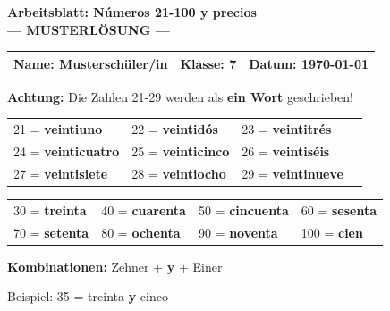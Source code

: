 \documentclass[11pt, a4paper]{article}
\newcommand{\fachfarbe}{spanisch}
\newcommand{\thema}{Números 21-100 y precios}
\newcommand{\klasse}{7}
\newcommand{\datum}{\today}
\newcommand{\loesung}[1]{\textcolor{loesung}{\textbf{#1}}}
\newcommand{\es}[1]{\textcolor{\fachfarbe}{\textbf{#1}}}
\begin{document}

\begin{center}
    {\Large\bfseries\textcolor{\fachfarbe}{Arbeitsblatt: \thema}}\\[0.3em]
    {\large\textcolor{loesung}{\textbf{--- MUSTERLÖSUNG ---}}}
\end{center}

\vspace{5pt}

\noindent
\begin{tabularx}{\textwidth}{|X|X|X|}
\hline
\textbf{Name:} \textcolor{loesung}{Musterschüler/in} &
\textbf{Klasse:} \klasse &
\textbf{Datum:} \datum \\
\hline
\end{tabularx}

\vspace{15pt}


\begin{merkkasten}
\textbf{Achtung:} Die Zahlen 21-29 werden als \textbf{ein Wort} geschrieben!

\vspace{0.5em}

\begin{tabular}{llll}
21 = \loesung{veintiuno} & 22 = \loesung{veintidós} & 23 = \loesung{veintitrés} \\[0.8em]
24 = \loesung{veinticuatro} & 25 = \loesung{veinticinco} & 26 = \loesung{veintiséis} \\[0.8em]
27 = \loesung{veintisiete} & 28 = \loesung{veintiocho} & 29 = \loesung{veintinueve} \\
\end{tabular}

\end{merkkasten}

\vspace{10pt}


\begin{merkkasten}
\begin{tabular}{llll}
30 = \loesung{treinta} & 40 = \loesung{cuarenta} & 50 = \loesung{cincuenta} & 60 = \loesung{sesenta} \\[0.8em]
70 = \loesung{setenta} & 80 = \loesung{ochenta} & 90 = \loesung{noventa} & 100 = \loesung{cien} \\
\end{tabular}

\vspace{0.5em}

\textbf{Kombinationen:} Zehner + \es{y} + Einer

Beispiel: 35 = treinta \es{y} cinco
\end{merkkasten}
\end{document}

